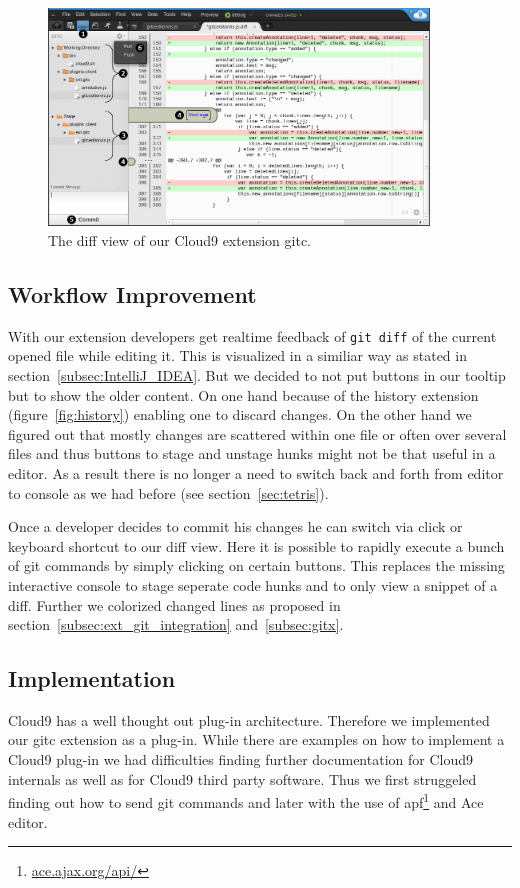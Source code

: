 \begin{figure}
   \centering
   \includegraphics[width=0.9\textwidth]{images/extension_unstage.png}
   \caption{The diff view of our Cloud9 extension gitc.}
   \label{fig:diff_view}
\end{figure}

\subsection{Workflow Improvement}
With our extension developers get realtime feedback of \texttt{git diff} of the current opened file while editing it.
This is visualized in a similiar way as stated in section~\ref{subsec:IntelliJ_IDEA}.
But we decided to not put buttons in our tooltip but to show the older content.
On one hand because of the history extension (figure~\ref{fig:history}) enabling one to discard changes.
On the other hand we figured out that mostly changes are scattered within one file or often over several files and thus buttons to stage and unstage hunks might not be that useful in a editor.
As a result there is no longer a need to switch back and forth from editor to console as we had before (see section~\ref{sec:tetris}).

Once a developer decides to commit his changes he can switch via click or keyboard shortcut to our diff view.
Here it is possible to rapidly execute a bunch of git commands by simply clicking on certain buttons.
This replaces the missing interactive console to stage seperate code hunks and to only view a snippet of a diff.
Further we colorized changed lines as proposed in section~\ref{subsec:ext_git_integration} and~\ref{subsec:gitx}.

\subsection{Implementation}
Cloud9 has a well thought out plug-in architecture.
Therefore we implemented our gitc extension as a plug-in.
While there are examples on how to implement a Cloud9 plug-in we had difficulties finding further documentation for Cloud9 internals as well as for Cloud9 third party software.
Thus we first struggeled finding out how to send git commands and later with the use of apf\footnote{\url{ace.ajax.org/api/}} and Ace editor.

